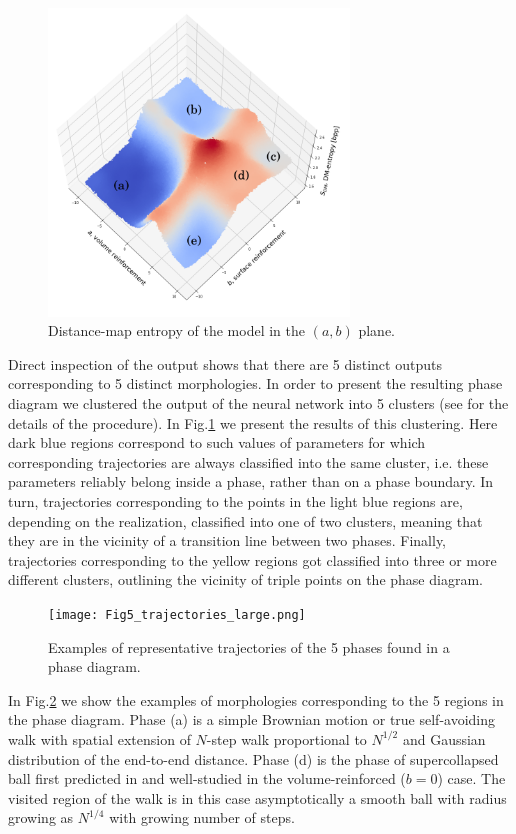\documentclass[aps,a4paper,twocolumn,showpacs]{revtex4}
\newcommand{\fig}[1]{Fig.\ref{#1}}
\begin{document}
\begin{figure}[ht]
\includegraphics[width=8cm]{Effective_entropy (1).png}
\caption{Distance-map entropy of the model in the $(a,b)$ plane.}
\label{fig04}
\end{figure}

Direct inspection of the output shows that there are 5 distinct outputs corresponding to 5 distinct morphologies. In order to present the resulting phase diagram we clustered the output of the neural network into 5 clusters (see \cite{supp} for the details of the procedure). In \fig{fig04} we present the results of this clustering. Here dark blue regions correspond to such values of parameters for which corresponding trajectories are always classified into the same cluster, i.e. these parameters reliably belong inside a phase, rather than on a phase boundary. In turn, trajectories corresponding to the points in the light blue regions are, depending on the realization, classified into one of two clusters, meaning that they are in the vicinity of a transition line between two phases. Finally, trajectories corresponding to the yellow regions got classified into three or more different clusters, outlining the vicinity of triple points on the phase diagram. 

\begin{figure}[ht]
\texttt{[image: Fig5\_trajectories\_large.png]}
\caption{Examples of representative trajectories of the 5 phases found in a phase diagram.}
\label{fig05}
\end{figure}

In \fig{fig05} we show the examples of morphologies corresponding to the 5 regions in the phase diagram. Phase (a) is a simple Brownian motion or true self-avoiding walk with spatial extension of $N$-step walk proportional to $N^{1/2}$ and Gaussian distribution of the end-to-end distance. Phase (d) is the phase of supercollapsed ball first predicted in \cite{sapozhnikov} and well-studied in the volume-reinforced ($b=0$) case. The visited region of the walk is in this case asymptotically a smooth ball with radius growing as $N^{1/4}$ with growing number of steps. 
\end{document}
